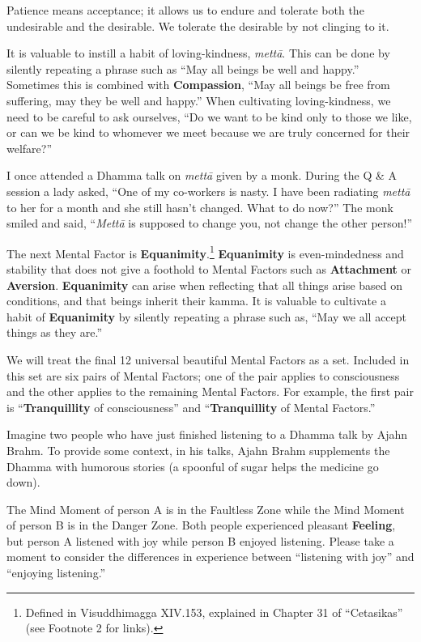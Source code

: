 Patience means acceptance; it allows us to endure and tolerate both the undesirable and the desirable. We tolerate the desirable by not clinging to it.

It is valuable to instill a habit of loving-kindness, \textit{mettā}. This can be done by silently repeating a phrase such as “May all beings be well and happy.” Sometimes this is combined with \textbf{Compassion}, “May all beings be free from suffering, may they be well and happy.” When cultivating loving-kindness, we need to be careful to ask ourselves, “Do we want to be kind only to those we like, or can we be kind to whomever we meet because we are truly concerned for their welfare?”

I once attended a Dhamma talk on \textit{mettā} given by a monk. During the Q \& A session a lady asked, “One of my co-workers is nasty. I have been radiating \textit{mettā} to her for a month and she still hasn’t changed. What to do now?” The monk smiled and said, “\textit{Mettā} is supposed to change you, not change the other person!”

The next Mental Factor is \textbf{Equanimity}.\footnote{Defined in Visuddhimagga XIV.153, explained in Chapter 31 of “Cetasikas” (see Footnote 2 for links).} \textbf{Equanimity} is even-mindedness and stability that does not give a foothold to Mental Factors such as \textbf{Attachment} or \textbf{Aversion}. \textbf{Equanimity} can arise when reflecting that all things arise based on conditions, and that beings inherit their kamma. It is valuable to cultivate a habit of \textbf{Equanimity} by silently repeating a phrase such as, “May we all accept things as they are.”

\pagebreak

We will treat the final 12 universal beautiful Mental Factors as a set. Included in this set are six pairs of Mental Factors; one of the pair applies to consciousness and the other applies to the remaining Mental Factors. For example, the first pair is “\textbf{Tranquillity} of consciousness” and “\textbf{Tranquillity} of Mental Factors.”

Imagine two people who have just finished listening to a Dhamma talk by Ajahn Brahm. To provide some context, in his talks, Ajahn Brahm supplements the Dhamma with humorous stories (a spoonful of sugar helps the medicine go down).

The Mind Moment of person A is in the Faultless Zone while the Mind Moment of person B is in the Danger Zone. Both people experienced pleasant \textbf{Feeling}, but person A listened with joy while person B enjoyed listening. Please take a moment to  consider the differences in experience between “listening with joy” and “enjoying listening.”

